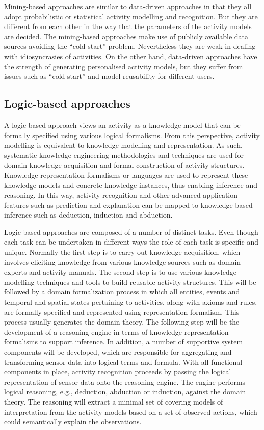 Mining-based approaches are similar to data-driven approaches in that they all adopt probabilistic or statistical activity modelling and recognition. But they are different from each other in the way that the parameters of the activity models are decided. The mining-based approaches make use of publicly available data sources avoiding the “cold start” problem. Nevertheless they are weak in dealing with idiosyncrasies of activities. On the other hand, data-driven approaches have the strength of generating personalised activity models, but they suffer from issues such as “cold start” and model reusability for different users.

\subsection{Logic-based approaches}

A logic-based approach views an activity as a knowledge model that can be formally specified using various logical formalisms. From this perspective, activity modelling is equivalent to knowledge modelling and representation. As such, systematic knowledge engineering methodologies and techniques are used for domain knowledge acquisition and formal construction of activity structures. Knowledge representation formalisms or languages are used to represent these knowledge models and concrete knowledge instances, thus enabling inference and reasoning. In this way, activity recognition and other advanced application features such as prediction and explanation can be mapped to knowledge-based inference such as deduction, induction and abduction. 

Logic-based approaches are composed of a number of distinct tasks. Even though each task can be undertaken in different ways the role of each task is specific and unique. Normally the first step is to carry out knowledge acquisition, which involves eliciting knowledge from various knowledge sources such as domain experts and activity manuals. The second step is to use various knowledge modelling techniques and tools to build reusable activity structures. This will be followed by a domain formalization process in which all entities, events and temporal and spatial states pertaining to activities, along with axioms and rules, are formally specified and represented using representation formalism. This process usually generates the domain theory. The following step will be the development of a reasoning engine in terms of knowledge representation formalisms to support inference. In addition, a number of supportive system components will be developed, which are responsible for aggregating and transforming sensor data into logical terms and formula. With all functional components in place, activity recognition proceeds by passing the logical representation of sensor data onto the reasoning engine. The engine performs logical reasoning, e.g., deduction, abduction or induction, against the domain theory. The reasoning will extract a minimal set of covering models of interpretation from the activity models based on a set of observed actions, which could semantically explain the observations.

